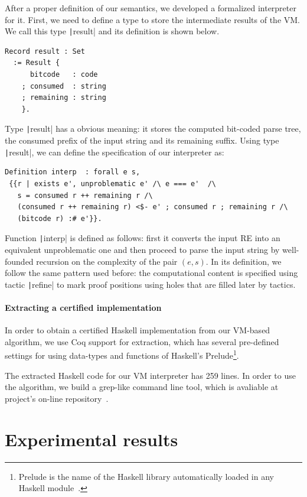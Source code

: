 \documentclass[review]{elsarticle}
\newcommand{\coq}[1]{\texttt|#1|}
\theoremstyle{definition}
\begin{document}
After a proper definition of our semantics, we developed a formalized
interpreter for it. First, we need to define a type to store the
intermediate results of the VM. We call this type \coq{result} and its
definition is shown below.
\begin{verbatim}
Record result : Set
  := Result {
      bitcode   : code
    ; consumed  : string  
    ; remaining : string
    }.
\end{verbatim} 
Type \coq{result} has a obvious meaning: it stores the computed bit-coded parse
tree, the consumed prefix of the input string and its remaining suffix. Using
type \coq{result}, we can define the specification of our interpreter as:
\begin{verbatim}
Definition interp  : forall e s,
 {{r | exists e', unproblematic e' /\ e === e'  /\
   s = consumed r ++ remaining r /\
   (consumed r ++ remaining r) <$- e' ; consumed r ; remaining r /\
   (bitcode r) :# e'}}. 
\end{verbatim}
Function \coq{interp} is defined as follows: first it converts the input RE into
an equivalent unproblematic one and then proceed to parse the input string by
well-founded recursion on the complexity of the pair $(e,s)$. In its definition,
we follow the same pattern used before: the computational content is specified
using tactic \coq{refine} to mark proof positions using holes that are filled
later by tactics.

\paragraph{Extracting a certified implementation}

In order to obtain a certified Haskell implementation from our VM-based algorithm,
we use Coq support for extraction, which has several pre-defined
settings for using data-types and functions of Haskell's
Prelude\footnote{Prelude is the name of the Haskell library automatically loaded
in any Haskell module~\cite{Haskell98}.}.

The extracted Haskell code for our VM interpreter has 259 lines. In order to use 
the algorithm, we build a grep-like command line tool, which is avaliable at 
project's on-line repository~\cite{regexvm-rep}. 

\section{Experimental results}\label{section:experiments}
\end{document}
